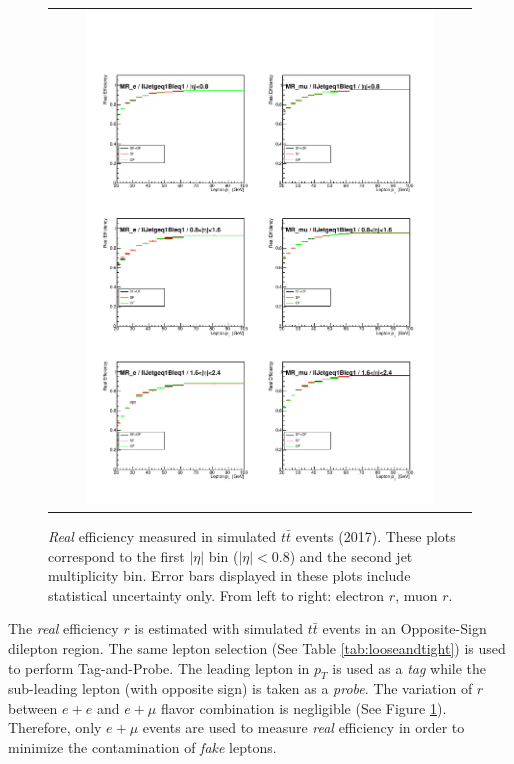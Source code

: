 \begin{figure}[tbh!]
 \begin{center}
 \begin{tabular}{c}
 \includegraphics[width=0.85\textwidth]{figures/Part3/Nonprompt/MR/real_eff}
 \end{tabular}
 \caption{\emph{Real} efficiency measured in simulated $t\bar{t}$ events (2017). These plots correspond to the first $|\eta|$ bin ($|\eta|<$0.8) and the second jet multiplicity bin. Error bars displayed in these plots include statistical uncertainty only. From left to right: electron $r$, muon $r$.}
 \label{fig:real_eff}
 \end{center}
\end{figure}

The \emph{real} efficiency $r$ is estimated with simulated $t\bar{t}$ events in an Opposite-Sign dilepton region. The same lepton selection (See Table \ref{tab:looseandtight}) is used to perform Tag-and-Probe. The leading lepton in $p_{T}$ is used as a \emph{tag} while the sub-leading lepton (with opposite sign) is taken as a \emph{probe}. The variation of $r$ between $e+e$ and $e+\mu$ flavor combination is negligible (See Figure \ref{fig:real_eff}). Therefore, only $e+\mu$ events are used to measure \emph{real} efficiency in order to minimize the contamination of \emph{fake} leptons.

